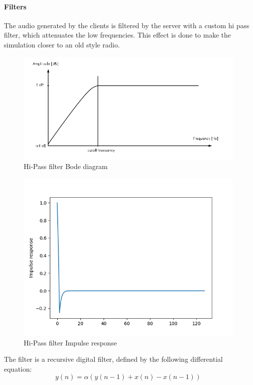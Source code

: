 \documentclass[12pt]{article}
\begin{document}
\paragraph{Filters \cite{filters}}
The audio generated by the clients is filtered by the server with a custom hi pass filter, which attenuates the low frequencies. This effect is done to make the simulation closer to an old style radio.
\begin{figure}[H]
\includegraphics[width=\textwidth]{hipass}
\caption{Hi-Pass filter Bode diagram}
\end{figure}
\begin{figure}[H]
\includegraphics[width=\textwidth]{impulse_response}
\caption{Hi-Pass filter Impulse response}
\end{figure}
\bigskip
The filter is a recursive digital filter, defined by the following differential equation:
\begin{equation} y(n) =\alpha (y(n-1) + x(n) - x(n-1))\end{equation}
\end{document}
